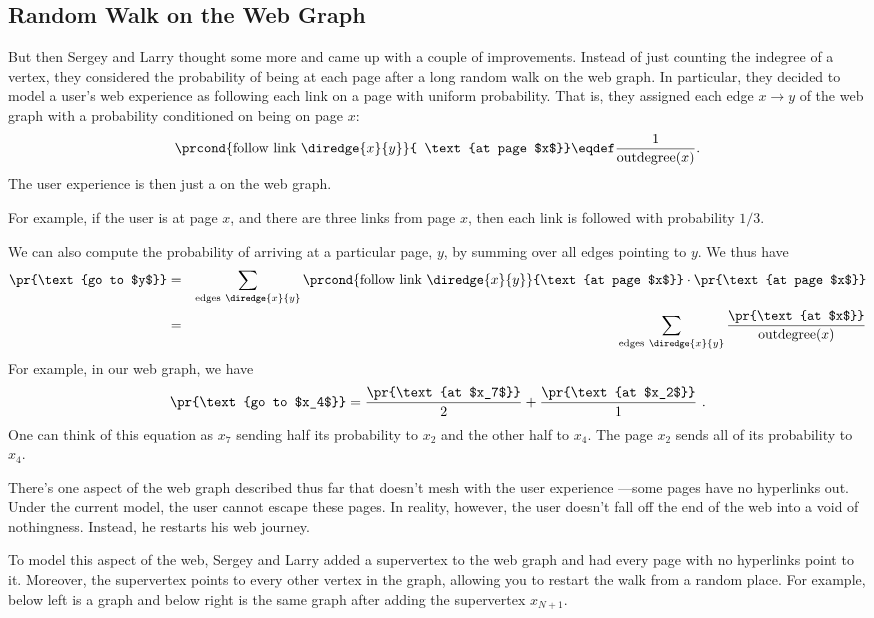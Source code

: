 \subsection{Random Walk on the Web Graph}

But then Sergey and Larry thought some more and came up with a couple of
improvements.  Instead of just counting the indegree of a vertex, they
considered the probability of being at each page after a long random walk
on the web graph.  In particular, they decided to model a user's web
experience as following each link on a page with uniform probability.
That is, they assigned each edge $x \rightarrow y$ of the web graph with a
probability conditioned on being on page $x$:
\[
\prcond{\text{follow link}\ \diredge{x}{y}}{ \text{at page $x$}} \eqdef
\frac{1}{\text{outdegree}(x)}.
\]
The user experience is then just a  on the web graph.

For example, if the user is at page $x$, and there are three links from
page $x$, then each link is followed with probability $1/3$.

We can also compute the probability of arriving at a particular page, $y$,
by summing over all edges pointing to $y$.  We thus have
\begin{eqnarray}
  \pr{\text{go to $y$}} &=&  \sum_{\text{edges}\ \diredge{x}{y}}
  \prcond{\text{follow link}\ \diredge{x}{y}}{\text{at page $x$}} \cdot
  \pr{\text{at page $x$}} \nonumber\\
  &=& \sum_{\text{edges}\ \diredge{x}{y}} \frac{\pr{\text{at
      $x$}}}{\text{outdegree}(x)} \label{LN12:stepprob}
\end{eqnarray}
For example, in our web graph, we have
\[ \pr{\text{go to $x_4$}} = \frac{\pr{\text{at $x_7$}}}{2} +
\frac{\pr{\text{at $x_2$}}}{1} \ .
\]
One can think of this equation as $x_7$ sending half its probability to
$x_2$ and the other half to $x_4$. The page $x_2$ sends all of its
probability to $x_4$.

There's one aspect of the web graph described thus far that doesn't mesh
with the user experience ---some pages have no hyperlinks out.  Under the
current model, the user cannot escape these pages.  In reality, however,
the user doesn't fall off the end of the web into a void of nothingness.
Instead, he restarts his web journey.

To model this aspect of the web, Sergey and Larry added a supervertex to the
web graph and had every page with no hyperlinks point to it.  Moreover,
the supervertex points to every other vertex in the graph, allowing you to
restart the walk from a random place.  For example, below left is a graph
and below right is the same graph after adding the supervertex $x_{N+1}$.

